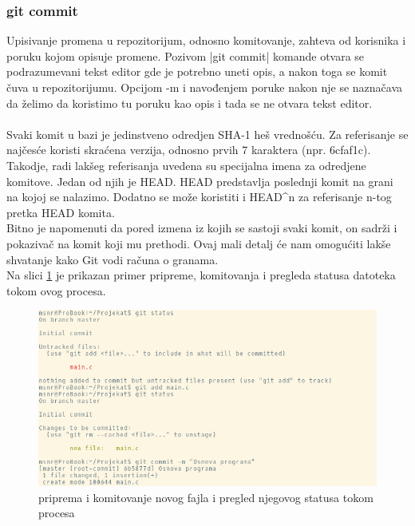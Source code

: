 \documentclass[a4paper]{article}
\begin{document}
{\subsubsection*{git commit}
\label{subsec:git_commit}
Upisivanje promena u repozitorijum, odnosno komitovanje, zahteva od korisnika i poruku kojom opisuje promene. Pozivom |git commit| komande otvara se podrazumevani tekst editor gde je potrebno uneti opis, a nakon toga se komit čuva u repozitorijumu. Opcijom -m i navođenjem poruke nakon nje se naznačava da želimo da koristimo tu poruku kao opis i tada se ne otvara tekst editor.
\\\\
Svaki komit u bazi je jedinstveno odredjen SHA-1 heš vrednošću. Za referisanje se najčesće koristi skraćena verzija, odnosno prvih 7 karaktera (npr. 6cfaf1c).
Takodje, radi lakšeg referisanja uvedena su specijalna imena za odredjene komitove. Jedan od njih je HEAD. HEAD predstavlja poslednji komit na grani na kojoj se nalazimo. Dodatno se može koristiti i HEAD\^{}n za referisanje n-tog pretka HEAD komita.\\
Bitno je napomenuti da pored izmena iz kojih se sastoji svaki komit, on sadrži i pokazivač na komit koji mu prethodi. Ovaj mali detalj će nam omogućiti lakše shvatanje kako Git vodi računa o granama.\\
Na slici \ref{fig:git_commit} je prikazan primer pripreme, komitovanja i pregleda statusa datoteka tokom ovog procesa.


\begin{figure}[h!]
\begin{center}
\includegraphics[scale=0.55]{images/commit.png}
\end{center}
\caption{priprema i komitovanje novog fajla i pregled njegovog statusa tokom procesa}
\label{fig:git_commit}
\end{figure}

}
\end{document}
